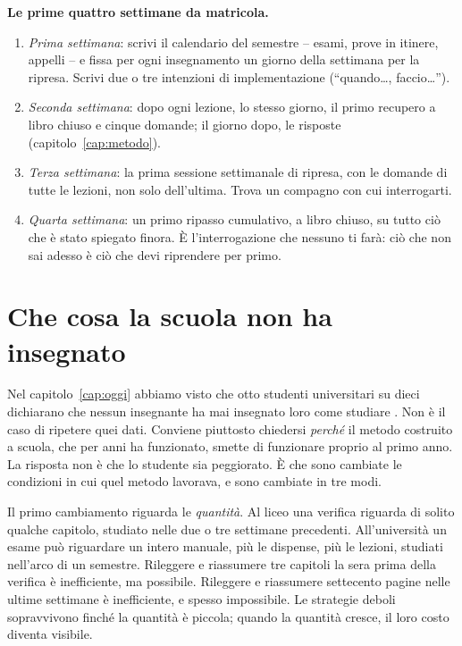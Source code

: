 \begin{inpratica}
\textbf{Le prime quattro settimane da matricola.}
\begin{enumerate}
  \item \emph{Prima settimana}: scrivi il calendario del semestre --
        esami, prove in itinere, appelli -- e fissa per ogni
        insegnamento un giorno della settimana per la ripresa. Scrivi
        due o tre intenzioni di implementazione (\enquote{quando\dots,
        faccio\dots}).
  \item \emph{Seconda settimana}: dopo ogni lezione, lo stesso giorno,
        il primo recupero a libro chiuso e cinque domande; il giorno
        dopo, le risposte (capitolo~\ref{cap:metodo}).
  \item \emph{Terza settimana}: la prima sessione settimanale di
        ripresa, con le domande di tutte le lezioni, non solo
        dell'ultima. Trova un compagno con cui interrogarti.
  \item \emph{Quarta settimana}: un primo ripasso cumulativo, a libro
        chiuso, su tutto ciò che è stato spiegato finora. È
        l'interrogazione che nessuno ti farà: ciò che non sai adesso è
        ciò che devi riprendere per primo.
\end{enumerate}
\end{inpratica}

\section{Che cosa la scuola non ha insegnato}

Nel capitolo~\ref{cap:oggi} abbiamo visto che otto studenti
universitari su dieci dichiarano che nessun insegnante ha mai
insegnato loro come studiare \parencite{kornell2007}. Non è il caso di
ripetere quei dati. Conviene piuttosto chiedersi \emph{perché} il
metodo costruito a scuola, che per anni ha funzionato, smette di
funzionare proprio al primo anno. La risposta non è che lo studente
sia peggiorato. È che sono cambiate le condizioni in cui quel metodo
lavorava, e sono cambiate in tre modi.

Il primo cambiamento riguarda le \emph{quantità}. Al liceo una
verifica riguarda di solito qualche capitolo, studiato nelle due o tre
settimane precedenti. All'università un esame può riguardare un intero
manuale, più le dispense, più le lezioni, studiati nell'arco di un
semestre. Rileggere e riassumere tre capitoli la sera prima della
verifica è inefficiente, ma possibile. Rileggere e riassumere
settecento pagine nelle ultime settimane è inefficiente, e spesso
impossibile. Le strategie deboli sopravvivono finché la quantità è
piccola; quando la quantità cresce, il loro costo diventa visibile.


